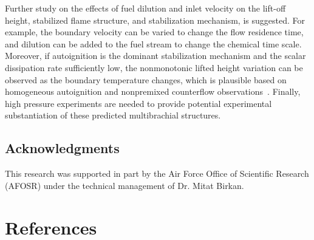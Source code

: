 \documentclass[review,3p,times]{elsarticle}
\begin{document}
Further study on the effects of fuel dilution and inlet velocity on the lift-off height, stabilized flame structure, and stabilization mechanism, is suggested.  For example, the boundary velocity can be varied to change the flow residence time, and dilution can be added to the fuel stream to change the chemical time scale.  Moreover, if autoignition is the dominant stabilization mechanism and the scalar dissipation rate sufficiently low, the nonmonotonic lifted height variation can be observed as the boundary temperature changes, which is plausible based on homogeneous autoignition and nonpremixed counterflow observations~\cite{deng14}.  \textcolor{mycolor}{Finally, high pressure experiments are needed to provide potential experimental substantiation of these predicted multibrachial structures.}


\textcolor{mycolor}{\section*{Acknowledgments}
This research was supported in part by the Air Force Office of Scientific Research (AFOSR) under the technical management of Dr. Mitat Birkan.}


\section*{References}



\renewcommand{\thefigure}{\arabic{figure}}
\renewcommand{\thetable}{\arabic{table}}
\end{document}
